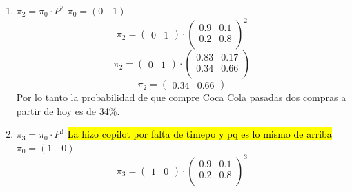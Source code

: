 \documentclass{templateNote}
\begin{document}
\begin{enumerate}
    \begin{enumerate}[label=\alph*)]
        \item $\pi_2 = \pi_0 \cdot P^2$
        $\pi_0 = (0 \quad 1)$
        \begin{equation*}
            \pi_2 = 
            \begin{pmatrix}
                0 & 1
            \end{pmatrix}
            \cdot
            \begin{pmatrix}
                0.9 & 0.1\\
                0.2 & 0.8\\
            \end{pmatrix}^2
        \end{equation*}
        \begin{equation*}
            \pi_2 = 
            \begin{pmatrix}
                0 & 1
            \end{pmatrix}
            \cdot
            \begin{pmatrix}
                0.83 & 0.17\\
                0.34 & 0.66\\
            \end{pmatrix}
        \end{equation*}
        \begin{equation*}
            \pi_2 = 
            \begin{pmatrix}
                0.34 & 0.66
            \end{pmatrix}
        \end{equation*}
        Por lo tanto la probabilidad de que compre Coca Cola pasadas dos compras a partir de hoy es de 34\%.
        \item $\pi_3 = \pi_0 \cdot P^3$ \hl{La hizo copilot por falta de timepo y pq es lo mismo de arriba}
        $\pi_0 = (1 \quad 0)$
        \begin{equation*}
            \pi_3 = 
            \begin{pmatrix}
                1 & 0
            \end{pmatrix}
            \cdot
            \begin{pmatrix}
                0.9 & 0.1\\
                0.2 & 0.8\\
            \end{pmatrix}^3
        \end{equation*}
        \begin{equation*}

\end{equation*}
\end{enumerate}
\end{enumerate}
\end{document}
